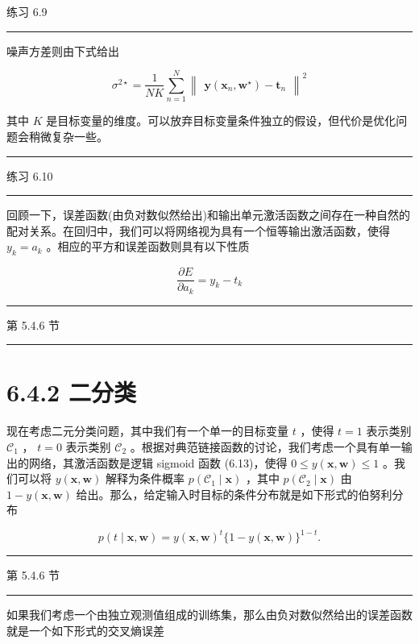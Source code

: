 \documentclass[10pt]{article}
\newcommand{\HRule}{\begin{center}\rule{0.9\linewidth}{0.2mm}\end{center}}
\begin{document}
练习 6.9

\HRule

噪声方差则由下式给出

\[
{\sigma }^{2 \star  } = \frac{1}{NK}\mathop{\sum }\limits_{{n = 1}}^{N}{\begin{Vmatrix}\mathbf{y}\left( {\mathbf{x}}_{n},{\mathbf{w}}^{ \star  }\right)  - {\mathbf{t}}_{n}\end{Vmatrix}}^{2} \tag{6.30}
\]

其中 \(K\) 是目标变量的维度。可以放弃目标变量条件独立的假设，但代价是优化问题会稍微复杂一些。

\HRule

练习 6.10

\HRule

回顾一下，误差函数(由负对数似然给出)和输出单元激活函数之间存在一种自然的配对关系。在回归中，我们可以将网络视为具有一个恒等输出激活函数，使得 \({y}_{k} = {a}_{k}\) 。相应的平方和误差函数则具有以下性质

\[
\frac{\partial E}{\partial {a}_{k}} = {y}_{k} - {t}_{k} \tag{6.31}
\]

\HRule

第 5.4.6 节

\HRule

\section*{6.4.2 二分类}

现在考虑二元分类问题，其中我们有一个单一的目标变量 \(t\) ，使得 \(t = 1\) 表示类别 \({\mathcal{C}}_{1}\) ， \(t = 0\) 表示类别 \({\mathcal{C}}_{2}\) 。根据对典范链接函数的讨论，我们考虑一个具有单一输出的网络，其激活函数是逻辑 sigmoid 函数 (6.13)，使得 \(0 \leq  y\left( {\mathbf{x},\mathbf{w}}\right)  \leq  1\) 。我们可以将 \(y\left( {\mathbf{x},\mathbf{w}}\right)\) 解释为条件概率 \(p\left( {{\mathcal{C}}_{1} \mid  \mathbf{x}}\right)\) ，其中 \(p\left( {{\mathcal{C}}_{2} \mid  \mathbf{x}}\right)\) 由 \(1 - y\left( {\mathbf{x},\mathbf{w}}\right)\) 给出。那么，给定输入时目标的条件分布就是如下形式的伯努利分布

\[
p\left( {t \mid  \mathbf{x},\mathbf{w}}\right)  = y{\left( \mathbf{x},\mathbf{w}\right) }^{t}\{ 1 - y\left( {\mathbf{x},\mathbf{w}}\right) {\} }^{1 - t}. \tag{6.32}
\]

\HRule

第 5.4.6 节

\HRule

如果我们考虑一个由独立观测值组成的训练集，那么由负对数似然给出的误差函数就是一个如下形式的交叉熵误差
\end{document}
